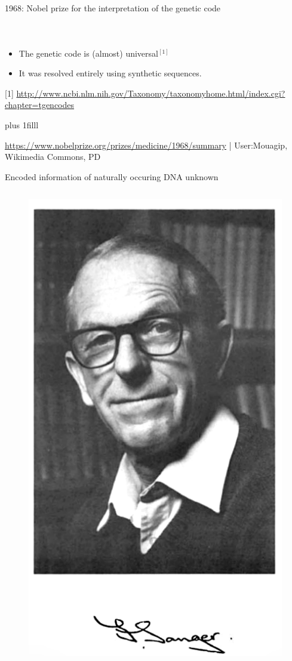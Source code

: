 \documentclass[10pt]{beamer}
\newcommand{\credit}[1]{{\vskip0pt plus 1filll \par \raggedleft \scriptsize \mdseries \color{mDarkBrown} #1 \par}}
\begin{document}
\begin{frame}{1968: Nobel prize for the interpretation of the genetic code}
\begin{columns}[T,onlytextwidth]
\begin{figure}
		\end{figure}
	\end{columns}
	\begin{itemize}
		\item The genetic code is (almost) universal$^{[1]}$ 
		\item It was resolved entirely using synthetic sequences.
	\end{itemize}
	 \par {\scriptsize [1] \url{http://www.ncbi.nlm.nih.gov/Taxonomy/taxonomyhome.html/index.cgi?chapter=tgencodes}}
	\credit{\url{https://www.nobelprize.org/prizes/medicine/1968/summary} | User:Mouagip, Wikimedia Commons, PD}
\end{frame}

\begin{frame}{Encoded information of naturally occuring DNA unknown}
	\begin{columns}[T,onlytextwidth]
		\begin{figure}
			\includegraphics[width=\textwidth]{./figures/sanger.png}

\end{figure}
\end{columns}
\end{frame}
\end{document}
